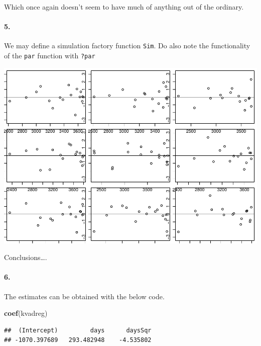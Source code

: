\documentclass[
]{article}
\newenvironment{Shaded}{\begin{snugshade}}{\end{snugshade}}
\newcommand{\KeywordTok}[1]{\textcolor[rgb]{0.13,0.29,0.53}{\textbf{#1}}}
\newcommand{\NormalTok}[1]{#1}
\begin{document}
Which once again doesn't seem to have much of anything out of the
ordinary.

\hypertarget{section-54}{%
\paragraph{\texorpdfstring{\textbf{5.}}{5.}}\label{section-54}}

We may define a simulation factory function \texttt{Sim}. Do also note
the functionality of the \texttt{par} function with \texttt{?par}

\begin{center}\includegraphics{matstatproblems20-21_files/figure-latex/unnamed-chunk-54-1} \end{center}

Conclusions\ldots.

\hypertarget{section-55}{%
\paragraph{\texorpdfstring{\textbf{6.}}{6.}}\label{section-55}}

The estimates can be obtained with the below code.

\begin{Shaded}
\begin{Highlighting}[]
\KeywordTok{coef}\NormalTok{(kvadreg)}
\end{Highlighting}
\end{Shaded}

\begin{verbatim}
##  (Intercept)         days      daysSqr 
## -1070.397689   293.482948    -4.535802
\end{verbatim}
\end{document}
